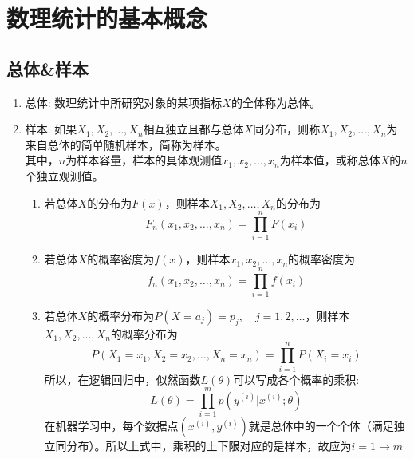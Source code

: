\section{数理统计的基本概念}
\subsection{总体\&样本}
\begin{enumerate}
	\item 总体: 数理统计中所研究对象的某项指标$X$的全体称为总体。
	\item 样本: 如果$X_1, X_2, \dots, X_n$相互独立且都与总体$X$同分布，则称$X_1, X_2, \dots, X_n$为来自总体的简单随机样本，简称为样本。\\
	其中，$n$为样本容量，样本的具体观测值$x_1, x_2, \dots, x_n$为样本值，或称总体$X$的$n$个独立观测值。
	\begin{enumerate}
		\item 若总体$X$的分布为$F(x)$，则样本$X_1, X_2, \dots, X_n$的分布为
		\begin{equation}
			F_n(x_1, x_2, \dots, x_n) = \prod_{i=1}^{n}F(x_i)
		\end{equation}

		\item 若总体$X$的概率密度为$f(x)$，则样本$x_1, x_2, \dots, x_n$的概率密度为
		\begin{equation}
			f_n(x_1, x_2, \dots, x_n) = \prod_{i=1}^{n}f(x_i)
		\end{equation}
		\item 若总体$X$的概率分布为$P(X=a_j)=p_j, \quad j = 1,2, \dots$，则样本$X_1, X_2, \dots, X_n$的概率分布为
		\begin{equation}
			P(X_1=x_1, X_2=x_2, \dots, X_n=x_n) = \prod_{i=1}^{n}P(X_i = x_i)
		\end{equation}
		所以，在逻辑回归中，似然函数$L(\theta)$可以写成各个概率的乘积:
		\begin{equation}
			L(\theta)=\prod_{i=1}^{m}p(y^{(i)}|x^{(i)}; \theta)
		\end{equation}
		在机器学习中，每个数据点$(x^{(i)},y^{(i)})$就是总体中的一个个体（满足独立同分布）。所以上式中，乘积的上下限对应的是样本，故应为$i=1 \to m$
	\end{enumerate}
\end{enumerate}

